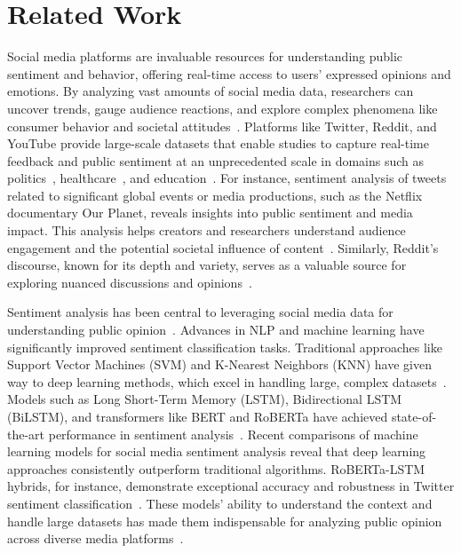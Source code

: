 \section{Related Work}
Social media platforms are invaluable resources for understanding public sentiment and behavior, offering real-time access to users' expressed opinions and emotions. By analyzing vast amounts of social media data, researchers can uncover trends, gauge audience reactions, and explore complex phenomena like consumer behavior and societal attitudes~\cite{elalaoui2018sentiment,cortis2021socialopinion}. Platforms like Twitter, Reddit, and YouTube provide large-scale datasets that enable studies to capture real-time feedback and public sentiment at an unprecedented scale in domains such as politics~\cite{ANTYPAS2023100242, Yarchi15032021,rezapour2017identifying}, healthcare~\cite{10.1007/978-3-031-27409-1_41,9810923}, and education~\cite{electronics11050715,luo2020like}.
For instance, sentiment analysis of tweets related to significant global events or media productions, such as the Netflix documentary Our Planet, reveals insights into public sentiment and media impact. This analysis helps creators and researchers understand audience engagement and the potential societal influence of content~\citep{ieeexplore_10533989}. Similarly, Reddit's discourse, known for its depth and variety, serves as a valuable source for exploring nuanced discussions and opinions~\citep{asurveyof2012opinion,10.1145/3543873.3587324,10.3389/frai.2023.1163577,bouzoubaa2024euphoria}.


Sentiment analysis has been central to leveraging social media data for understanding public opinion~\cite{ijerph15112537, QIAN2022103098}. Advances in NLP and machine learning have significantly improved sentiment classification tasks. Traditional approaches like Support Vector Machines (SVM) and K-Nearest Neighbors (KNN) have given way to deep learning methods, which excel in handling large, complex datasets~\cite{BANSAL2022100071}. Models such as Long Short-Term Memory (LSTM), Bidirectional LSTM (BiLSTM), and transformers like BERT and RoBERTa have achieved state-of-the-art performance in sentiment analysis~\citep{ieeexplore_9716923, ieeexplore_8629198, kapur2022sentimentanalysis}.
Recent comparisons of machine learning models for social media sentiment analysis reveal that deep learning approaches consistently outperform traditional algorithms. RoBERTa-LSTM hybrids, for instance, demonstrate exceptional accuracy and robustness in Twitter sentiment classification~\citep{ieeexplore_10331232}. These models' ability to understand the context and handle large datasets has made them indispensable for analyzing public opinion across diverse media platforms~\citep{arxiv_2408.08694, ieeexplore_10533989, arxiv_2407.13069}.

